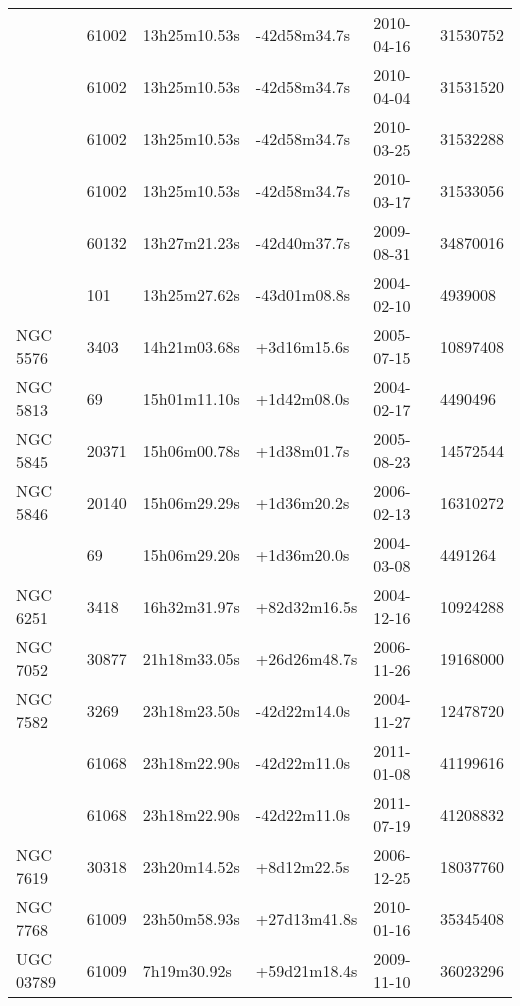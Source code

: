 \begin{table*}
\begin{center}
\begin{tabular}{llllll}
   & 61002 & 13h25m10.53s & -42d58m34.7s & 2010-04-16 & 31530752\\
   & 61002 & 13h25m10.53s & -42d58m34.7s & 2010-04-04 & 31531520\\
   & 61002 & 13h25m10.53s & -42d58m34.7s & 2010-03-25 & 31532288\\
   & 61002 & 13h25m10.53s & -42d58m34.7s & 2010-03-17 & 31533056\\
   & 60132 & 13h27m21.23s & -42d40m37.7s & 2009-08-31 & 34870016\\
   & 101 & 13h25m27.62s & -43d01m08.8s & 2004-02-10 & 4939008\\
  NGC 5576 & 3403 & 14h21m03.68s & +3d16m15.6s & 2005-07-15 & 10897408\\
  NGC 5813 & 69 & 15h01m11.10s & +1d42m08.0s & 2004-02-17 & 4490496\\
  NGC 5845 & 20371 & 15h06m00.78s & +1d38m01.7s & 2005-08-23 & 14572544\\
  NGC 5846 & 20140 & 15h06m29.29s & +1d36m20.2s & 2006-02-13 & 16310272\\
   & 69 & 15h06m29.20s & +1d36m20.0s & 2004-03-08 & 4491264\\
  NGC 6251 & 3418 & 16h32m31.97s & +82d32m16.5s & 2004-12-16 & 10924288\\
  NGC 7052 & 30877 & 21h18m33.05s & +26d26m48.7s & 2006-11-26 & 19168000\\
  NGC 7582 & 3269 & 23h18m23.50s & -42d22m14.0s & 2004-11-27 & 12478720\\
   & 61068 & 23h18m22.90s & -42d22m11.0s & 2011-01-08 & 41199616\\
   & 61068 & 23h18m22.90s & -42d22m11.0s & 2011-07-19 & 41208832\\
  NGC 7619 & 30318 & 23h20m14.52s & +8d12m22.5s & 2006-12-25 & 18037760\\
  NGC 7768 & 61009 & 23h50m58.93s & +27d13m41.8s & 2010-01-16 & 35345408\\
  UGC 03789 & 61009 & 7h19m30.92s & +59d21m18.4s & 2009-11-10 & 36023296\\
\hline
\end{tabular}
\end{center}
\end{table*}

